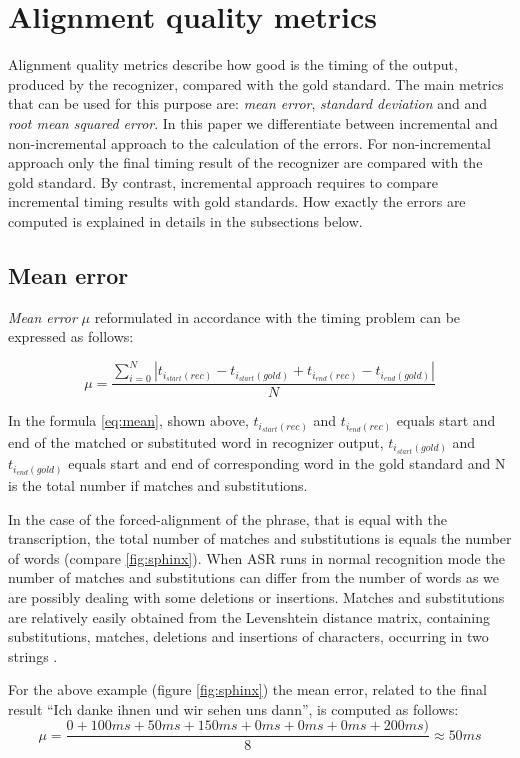 \section {Alignment quality metrics}
Alignment quality metrics describe how good is the timing of the output,
produced by the recognizer, compared with the gold standard. The main
metrics that can be used for this purpose are: \textit {mean error}, \textit {standard deviation} and 
and \textit {root mean squared error}. In this paper we
differentiate between incremental and non-incremental approach to the
calculation of the errors.  For non-incremental approach only the
final timing result of the recognizer are compared with the gold standard. By
contrast, incremental approach requires to compare incremental timing results with gold
standards.  How exactly the errors are computed is explained in details in
the subsections below. 
\subsection {Mean error} \textit {Mean error}  $\mu$ reformulated in
accordance with the timing problem can be expressed as follows:
\begin{center} 
\begin{equation} \mu=\frac{\sum_{i=0}^N
|t_{i_{start}(rec)}-t_{i_{start}(gold)}+t_{i_{end}(rec)}-t_{i_{end}(gold)}|}{N}
\label{eq:mean}
\end{equation}
\end{center} In the formula  \ref {eq:mean}, shown above, 
$t_{i_{start}(rec)}$ and $t_{i_{end}(rec)}$ equals start and end of the
matched or substituted word in recognizer output,
$t_{i_{start}(gold)}$ and $t_{i_{end}(gold)}$ equals start and end of
corresponding word in the gold standard and N is the total number if matches and substitutions.

In the case of the forced-alignment of the phrase, that is equal with the transcription, the total number of matches and substitutions is 
equals the number of words (compare \ref{fig:sphinx}). When ASR runs in normal
recognition mode the number of matches and substitutions can differ from the number of words
as we are possibly  dealing with some deletions or insertions. Matches and
substitutions are relatively easily obtained from the 
Levenshtein distance matrix, containing substitutions, matches, deletions and
insertions of characters, occurring in two strings \parencite {levenshtein1966}.  

For the above example (figure \ref{fig:sphinx}) the mean  error, related to
the final result ``Ich danke ihnen und wir sehen uns dann'', is computed as
follows:
\begin{equation} \mu=\frac{0+100ms+50 ms+150ms+0
ms+0 ms+0 ms+200ms)}{8} \approx 50 ms
\label{eq:mean_comp}
\end{equation}

